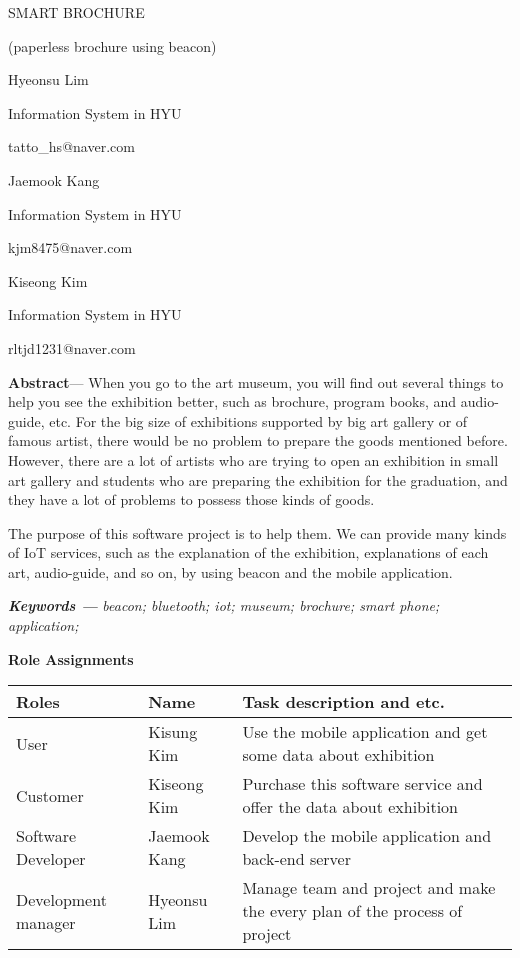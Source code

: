 \documentclass{article}
\begin{document}

\noindent SMART BROCHURE

\noindent (paperless brochure using beacon)

\noindent 

\noindent 

\noindent Hyeonsu Lim

\noindent Information System in HYU

\noindent tatto\_hs@naver.com

\noindent 

\noindent Jaemook Kang

\noindent Information System in HYU 

\noindent kjm8475@naver.com

\noindent 

\noindent Kiseong Kim

\noindent Information System in HYU

\noindent rltjd1231@naver.com

\textbf{Abstract}--- When you go to the art museum, you will find out several things to help you see the exhibition better, such as brochure, program books, and audio-guide, etc. For the big size of exhibitions supported by big art gallery or of famous artist, there would be no problem to prepare the goods mentioned before. However, there are a lot of artists who are trying to open an exhibition in small art gallery and students who are preparing the exhibition for the graduation, and they have a lot of problems to possess those kinds of goods.

The purpose of this software project is to help them. We can provide many kinds of IoT services, such as the explanation of the exhibition, explanations of each art, audio-guide, and so on, by using beacon and the mobile application.

\textbf{\textit{Keywords --- }}\textit{beacon; bluetooth; iot; museum; brochure; smart phone; application; }

\noindent \textbf{Role Assignments}

\textbf{\textit{}}

\textbf{\textit{}}

\textbf{\textit{}}

\noindent \textbf{}

\noindent \textbf{}

\begin{tabular}{|p{0.5in}|p{0.7in}|p{1.2in}|} \hline 
Roles & Name & Task description and etc. \\ \hline 
User & Kisung Kim & Use the mobile application and get some data about exhibition \\ \hline 
Customer & Kiseong Kim & Purchase this software service and offer the data about exhibition \\ \hline 
Software Developer & Jaemook Kang & Develop the mobile application and back-end server \\ \hline 
Development manager & Hyeonsu Lim & Manage team and project and make the every plan of the process of project \\ \hline 
\end{tabular}
\end{document}
